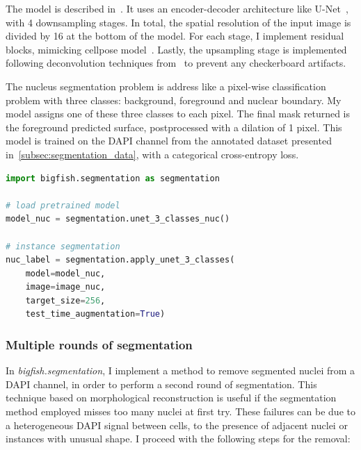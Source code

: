 The model is described in~\cite{Imbert_fq_2022}.
It uses an encoder-decoder architecture like U-Net~\cite{Ronneberger_unet}, with 4 downsampling stages.
In total, the spatial resolution of the input image is divided by 16 at the bottom of the model.
For each stage, I implement residual blocks, mimicking cellpose model~\cite{stringer_cellpose_2021}.
Lastly, the upsampling stage is implemented following deconvolution techniques from~\cite{odena2016deconvolution} to prevent any checkerboard artifacts.

The nucleus segmentation problem is address like a pixel-wise classification problem with three classes: background, foreground and nuclear boundary.
My model assigns one of these three classes to each pixel.
The final mask returned is the foreground predicted surface, postprocessed with a dilation of 1 pixel.
This model is trained on the DAPI channel from the annotated dataset presented in~\ref{subsec:segmentation_data}, with a categorical cross-entropy loss.\\

\begin{minipage}{0.9\textwidth}
\begin{lstlisting}[language=Python]
import bigfish.segmentation as segmentation

# load pretrained model
model_nuc = segmentation.unet_3_classes_nuc()

# instance segmentation
nuc_label = segmentation.apply_unet_3_classes(
    model=model_nuc,
	image=image_nuc,
	target_size=256,
	test_time_augmentation=True)
\end{lstlisting}
\end{minipage}

\subsubsection{Multiple rounds of segmentation}

In \emph{bigfish.segmentation}, I implement a method to remove segmented nuclei from a DAPI channel, in order to perform a second round of segmentation.
This technique based on morphological reconstruction is useful if the segmentation method employed misses too many nuclei at first try.
These failures can be due to a heterogeneous DAPI signal between cells, to the presence of adjacent nuclei or instances with unusual shape.
I proceed with the following steps for the removal:

